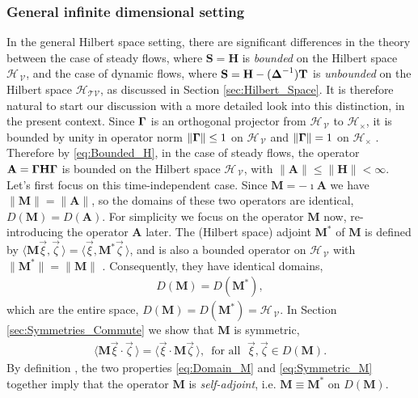 \documentclass[11pt]{amsart}
\newcommand{\Mb}{\mathbf{M}}
\newcommand{\Tb}{\mathbf{T}}
\newcommand{\Hb}{\mathbf{H}}
\newcommand{\Sb}{\mathbf{S}}
\newcommand{\Ab}{\mathbf{A}}
\newcommand{\Tc}{\mathcal{T}}
\newcommand{\Vc}{\mathcal{V}}
\newcommand{\Hs}{\mathscr{H}}
\newcommand\bDelta{\mbox{\boldmath${\Delta}$}}
\newcommand\bGamma{\mbox{\boldmath${\Gamma}$}}
\begin{document}
\subsubsection{General infinite dimensional setting}\label{sec:Integral_Rep_General}
%
In the general Hilbert space setting, there are significant
differences in the theory between the case of steady flows, where
$\Sb=\Hb$ is \emph{bounded} on the Hilbert space $\Hs_{\,\Vc}$, and
the case of dynamic flows, where $\Sb=\Hb-(\bDelta^{-1})\Tb$ is
\emph{unbounded} on the Hilbert space $\Hs_{\Tc\Vc}$, as discussed in
Section \ref{sec:Hilbert_Space}. It is therefore natural to start our
discussion with a more detailed look into this distinction, in the
present context. Since $\bGamma$ is an orthogonal projector from
$\Hs_{\,\Vc}$ to $\Hs_\times$, it is bounded by unity in operator norm
$\|\bGamma\|\leq1$ on $\Hs_{\,\Vc}$ and $\|\bGamma\|=1$ on $\Hs_\times$
\cite{Reed-1980,Stone:64}. Therefore by \eqref{eq:Bounded_H}, in the
case of  steady flows, the operator $\Ab=\bGamma\Hb\bGamma$ is bounded
on the Hilbert space $\Hs_{\,\Vc}$, with $\|\Ab\|\leq\|\Hb\|<\infty$. Let's first
focus on this time-independent case. Since $\Mb=-\imath\Ab$ we have 
$\|\Mb\|=\|\Ab\|$, so the domains of these two operators are identical,
$D(\Mb)=D(\Ab)$. For simplicity we focus on the operator $\Mb$ now,
re-introducing the operator $\Ab$ later. The (Hilbert space)
adjoint $\Mb^*$ of $\Mb$ is defined by
$\langle\Mb\vec{\xi},\vec{\zeta}\,\rangle=\langle\vec{\xi},\Mb^*\vec{\zeta}\,\rangle$, and is also a
bounded operator on $\Hs_{\,\Vc}$ with $\|\Mb^*\|=\|\Mb\|$
\cite{Reed-1980}. Consequently, they have identical domains,       
%
\begin{align}\label{eq:Domain_M}
  D(\Mb)=D(\Mb^*),
\end{align}
%
which are the entire space, $D(\Mb)=D(\Mb^*)=\Hs_{\,\Vc}$. In
Section \ref{sec:Symmetries_Commute} we show that $\Mb$ is symmetric,
%
\begin{align}\label{eq:Symmetric_M}
  \langle\Mb\vec{\xi}\cdot\vec{\zeta}\,\rangle=\langle\vec{\xi}\cdot\Mb\vec{\zeta}\,\rangle,
  \, \text{ for all } \; \vec{\xi},\vec{\zeta}\in D(\Mb).
\end{align}
%
By definition \cite{Reed-1980,Stone:64}, the two properties
\eqref{eq:Domain_M} and \eqref{eq:Symmetric_M} together imply that the
operator $\Mb$ is \emph{self-adjoint}, i.e. $\Mb\equiv\Mb^*$ on $D(\Mb)$.
\end{document}
